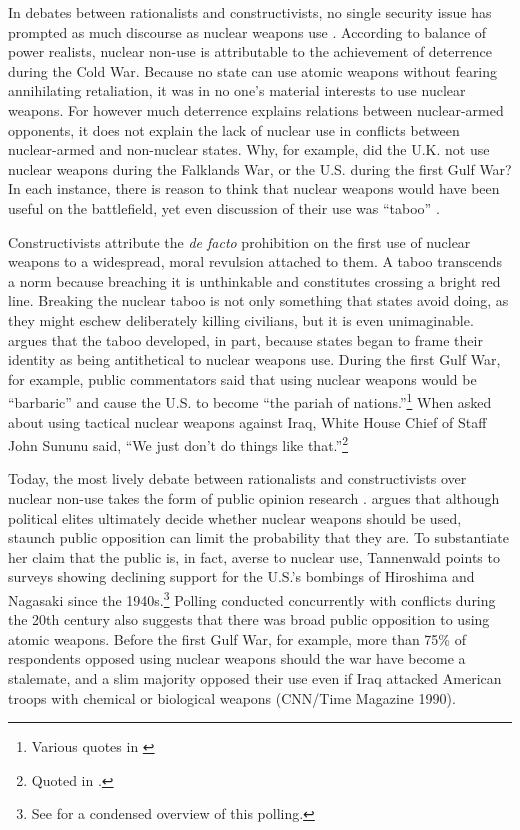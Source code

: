 \documentclass[12pt]{article}
\begin{document}
In debates between rationalists and constructivists, no single security issue has prompted as much discourse as nuclear weapons use \citep{paul_nuclear_1995, sagan_realist_2004, tannenwald_nuclear_2007, paul_taboo_2010, smetana_forum_2021}. According to balance of power realists, nuclear non-use is attributable to the achievement of deterrence during the Cold War. Because no state can use atomic weapons without fearing annihilating retaliation, it was in no one's material interests to use nuclear weapons. For however much deterrence explains relations between nuclear-armed opponents, it does not explain the lack of nuclear use in conflicts between nuclear-armed and non-nuclear states. Why, for example, did the U.K. not use nuclear weapons during the Falklands War, or the U.S. during the first Gulf War? In each instance, there is reason to think that nuclear weapons would have been useful on the battlefield, yet even discussion of their use was “taboo” \citep{paul_nuclear_1995, tannenwald_nuclear_2007}. 

Constructivists attribute the \textit{de facto} prohibition on the first use of nuclear weapons to a widespread, moral revulsion attached to them. A taboo transcends a norm because breaching it is unthinkable and constitutes crossing a bright red line. Breaking the nuclear taboo is not only something that states avoid doing, as they might eschew deliberately killing civilians, but it is even unimaginable. \citet{tannenwald_nuclear_2007} argues that the taboo developed, in part, because states began to frame their identity as being antithetical to nuclear weapons use. During the first Gulf War, for example, public commentators said that using nuclear weapons would be “barbaric” and cause the U.S. to become “the pariah of nations.”\footnote{Various quotes in \citet[304]{tannenwald_nuclear_2007}}  When asked about using tactical nuclear weapons against Iraq, White House Chief of Staff John Sununu said, “We just don’t do
things like that.”\footnote{Quoted in \citet[303]{tannenwald_nuclear_2007}.}


Today, the most lively debate between rationalists and constructivists over nuclear non-use takes the form of public opinion research \citep{smetana_forum_2021}. \citet{tannenwald_nuclear_2007} argues that although political elites ultimately decide whether nuclear weapons should be used, staunch public opposition can limit the probability that they are. To substantiate her claim that the public is, in fact, averse to nuclear use, Tannenwald points to surveys showing declining support for the U.S.'s bombings of Hiroshima and Nagasaki since the 1940s.\footnote{See \citet{sagan_revisiting_2017} for a condensed overview of this polling.} Polling conducted concurrently with conflicts during the 20th century also suggests that there was broad public opposition to using atomic weapons. Before the first Gulf War, for example, more than 75\% of respondents opposed using nuclear weapons should the war have become a stalemate, and a slim majority opposed their use even if Iraq attacked American troops with chemical or biological weapons (CNN/Time Magazine 1990). 
\end{document}
